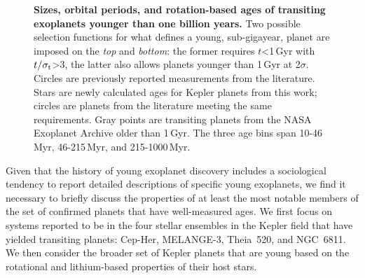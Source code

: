 \documentclass[11pt,twocolumn,tighten]{aastex63}
\begin{document}
%	
%

\begin{figure}[!t]
	\begin{center}
		
	\end{center}
	\vspace{-0.5cm}
	
	\caption{
		{\bf Sizes, orbital periods, and rotation-based ages of transiting exoplanets younger than one billion years.} 
		Two possible selection functions for what defines a young, sub-gigayear, planet
		are imposed on the {\it top} and {\it bottom}: the former requires $t$<1\,Gyr with
		$t/\sigma_{\rm t}$>3, the latter also allows planets younger than 1\,Gyr at 2$\sigma$.
		Circles are previously reported measurements from the literature.
		Stars are newly calculated ages for Kepler planets from this work; circles
		are planets from the literature meeting the same requirements.
		Gray points are transiting planets from the NASA Exoplanet Archive older than
		1\,Gyr.
		The three age bins span 10-46\,Myr, 46-215\,Myr, and 215-1000\,Myr.
		\label{fig:rp_period_age_results}
	}
\end{figure}



Given that the history of young exoplanet discovery includes a
sociological tendency to report detailed descriptions of specific
young exoplanets, we find it necessary to briefly discuss the
properties of at least the most notable members of the set of
confirmed planets that have well-measured ages.
We first focus on systems reported to be in the four stellar
ensembles in the Kepler field that have yielded transiting planets:
Cep-Her, MELANGE-3, Theia~520, and NGC~6811.
We then consider the broader set of Kepler planets that are young
based on the rotational and lithium-based properties of their host
stars.
\end{document}
